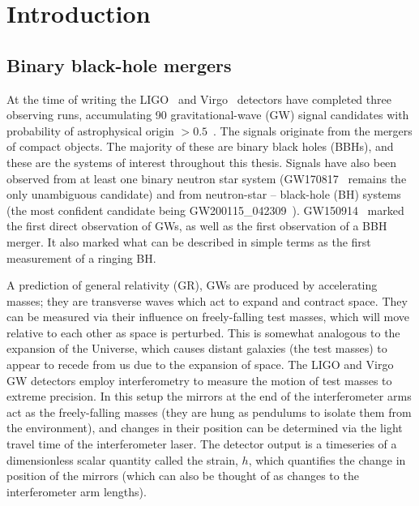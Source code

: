 
\chapter{Introduction}
\label{Chapter1}

\section{Binary black-hole mergers}

At the time of writing the 
LIGO~\cite{LIGOScientific:2014pky} and Virgo~\cite{VIRGO:2014yos} detectors have completed three observing runs, accumulating 90 gravitational-wave (GW) signal candidates with probability of astrophysical origin $> 0.5$~\cite{LIGOScientific:2018mvr, LIGOScientific:2020ibl, LIGOScientific:2021usb, LIGOScientific:2021djp}.
The signals originate from the mergers of compact objects. 
The majority of these are binary black holes (BBHs), and these are the systems of interest throughout this thesis.  
Signals have also been observed from at least one binary neutron star system (GW170817~\cite{LIGOScientific:2017vwq} remains the only unambiguous candidate) and from neutron-star -- black-hole (BH) systems (the most confident candidate being GW200115\_042309~\cite{LIGOScientific:2021qlt}).
GW150914~\cite{LIGOScientific:2016aoc} marked the first direct observation of GWs, as well as the first observation of a BBH merger.
It also marked what can be described in simple terms as the first measurement of a ringing BH.

A prediction of general relativity (GR), GWs are produced by accelerating masses; they are transverse waves which act to expand and contract space.
They can be measured via their influence on freely-falling test masses, which will move relative to each other as space is perturbed.
This is somewhat analogous %
to the expansion of the Universe, which causes distant galaxies (the test masses) to appear to recede from us due to the expansion of space.
The LIGO and Virgo GW detectors employ interferometry to measure the motion of test masses to extreme precision.
In this setup the mirrors at the end of the interferometer arms act as the freely-falling masses (they are hung as pendulums to isolate them from the environment), and changes in their position can be determined via the light travel time of the interferometer laser.
The detector output is a timeseries of a dimensionless scalar quantity called the strain, $h$, which quantifies the change in position of the mirrors (which can also be thought of as changes to the interferometer arm lengths).

